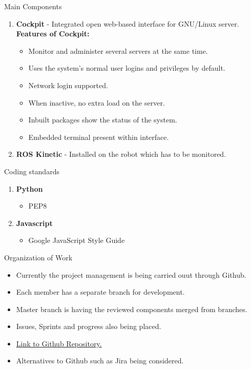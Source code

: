 \documentclass[aspectratio=169]{beamer}
\begin{document}
\begin{frame}{Main Components}
\vspace*{-10mm}
\linespread{1.5}
\begin{enumerate}
	\item \textbf{Cockpit} - Integrated open web-based interface for GNU/Linux server.\\ \textbf{Features of Cockpit:}
	\begin{itemize}
	\item Monitor and administer several servers at the same time.
	\item Uses the system’s normal user logins and privileges by default. 
	\item Network login supported.
	\item When inactive, no extra load on the server.
	\item Inbuilt packages show the status of the system.
	\item Embedded terminal present within interface.
	\end{itemize}
	\item \justify \textbf{ROS Kinetic} - Installed on the robot which has to be monitored.
\end{enumerate}
	
\end{frame}

\begin{frame}{Coding standards}
\vspace*{-25mm}
\linespread{2}
\begin{enumerate}
	\item \textbf{Python}
	\begin{itemize}
	\item PEP8
	\end{itemize}
	\item \textbf{Javascript}
		\begin{itemize}
	\item Google JavaScript Style Guide
	\end{itemize}
\end{enumerate}
	
\end{frame}

\begin{frame}{Organization of Work}
\vspace*{-15mm}
\linespread{2}
	\begin{itemize}
	\item Currently the project management is being carried ouut through Github.
	\item Each member has a separate branch for development.
	\item Master branch is having the reviewed components merged from branches.
	\item Issues, Sprints and progress also being placed.
	\item  \href{https://github.com/lokeshveeramacheneni/Software-Development-Project/tree/master}{\underline{Link to Github Repository.}} 
	\item Alternatives to Github such as Jira being considered.
	\end{itemize}
	
\end{frame}
\end{document}
